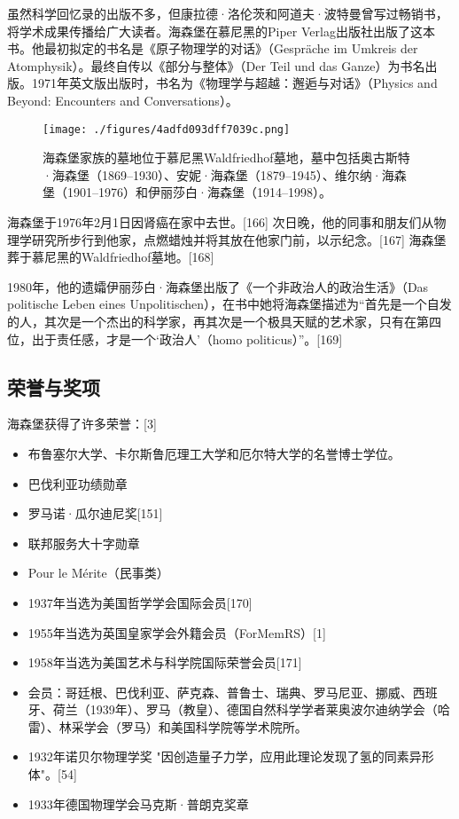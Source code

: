 虽然科学回忆录的出版不多，但康拉德·洛伦茨和阿道夫·波特曼曾写过畅销书，将学术成果传播给广大读者。海森堡在慕尼黑的Piper Verlag出版社出版了这本书。他最初拟定的书名是《原子物理学的对话》（Gespräche im Umkreis der Atomphysik）。最终自传以《部分与整体》（Der Teil und das Ganze）为书名出版。1971年英文版出版时，书名为《物理学与超越：邂逅与对话》（Physics and Beyond: Encounters and Conversations）。
\begin{figure}[ht]
\centering
\texttt{[image: ./figures/4adfd093dff7039c.png]}
\caption{海森堡家族的墓地位于慕尼黑Waldfriedhof墓地，墓中包括奥古斯特·海森堡（1869–1930）、安妮·海森堡（1879–1945）、维尔纳·海森堡（1901–1976）和伊丽莎白·海森堡（1914–1998）。} \label{fig_Heisen_4}
\end{figure}
海森堡于1976年2月1日因肾癌在家中去世。[166] 次日晚，他的同事和朋友们从物理学研究所步行到他家，点燃蜡烛并将其放在他家门前，以示纪念。[167] 海森堡葬于慕尼黑的Waldfriedhof墓地。[168]

1980年，他的遗孀伊丽莎白·海森堡出版了《一个非政治人的政治生活》（Das politische Leben eines Unpolitischen），在书中她将海森堡描述为“首先是一个自发的人，其次是一个杰出的科学家，再其次是一个极具天赋的艺术家，只有在第四位，出于责任感，才是一个‘政治人’（homo politicus）”。[169]
\subsection{荣誉与奖项}  
海森堡获得了许多荣誉：[3]
\begin{itemize}
\item 布鲁塞尔大学、卡尔斯鲁厄理工大学和厄尔特大学的名誉博士学位。  
\item 巴伐利亚功绩勋章  
\item 罗马诺·瓜尔迪尼奖[151]  
\item 联邦服务大十字勋章  
\item Pour le Mérite（民事类）  
\item 1937年当选为美国哲学学会国际会员[170]  
\item 1955年当选为英国皇家学会外籍会员（ForMemRS）[1]  
\item 1958年当选为美国艺术与科学院国际荣誉会员[171]  
\item 会员：哥廷根、巴伐利亚、萨克森、普鲁士、瑞典、罗马尼亚、挪威、西班牙、荷兰（1939年）、罗马（教皇）、德国自然科学学者莱奥波尔迪纳学会（哈雷）、林采学会（罗马）和美国科学院等学术院所。  
\item 1932年诺贝尔物理学奖 "因创造量子力学，应用此理论发现了氢的同素异形体"。[54]  
\item 1933年德国物理学会马克斯·普朗克奖章
\end{itemize}

